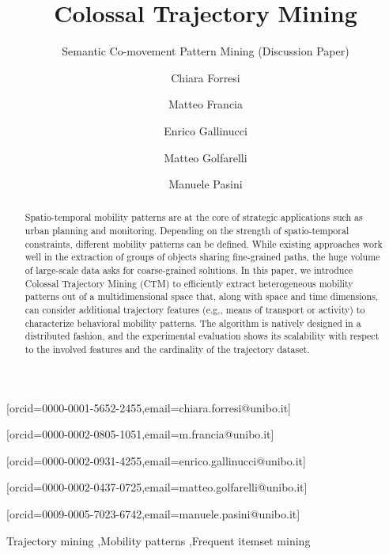 \documentclass[
]{ceurart}
\begin{document}
\sloppy
{}
\title{Colossal Trajectory Mining}
\subtitle{Semantic Co-movement Pattern Mining (Discussion Paper)}
\author[1]{Chiara Forresi}[orcid=0000-0001-5652-2455,email=chiara.forresi@unibo.it]
\address[1]{DISI --- University of Bologna, Cesena, Italy}
\author[1]{Matteo Francia}[orcid=0000-0002-0805-1051,email=m.francia@unibo.it]
\cormark[1]%
\author[1]{Enrico Gallinucci}[orcid=0000-0002-0931-4255,email=enrico.gallinucci@unibo.it]
\author[1]{Matteo Golfarelli}[orcid=0000-0002-0437-0725,email=matteo.golfarelli@unibo.it]
\author[1]{Manuele Pasini}[orcid=0009-0005-7023-6742,email=manuele.pasini@unibo.it]

\begin{abstract}
Spatio-temporal mobility patterns are at the core of strategic applications such as urban planning and monitoring.
Depending on the strength of spatio-temporal constraints, different mobility patterns can be defined. 
While existing approaches work well in the extraction of groups of objects sharing fine-grained paths, the huge volume of large-scale data asks for coarse-grained solutions.
In this paper, we introduce Colossal Trajectory Mining (CTM) to efficiently extract heterogeneous mobility patterns out of a multidimensional space that, along with space and time dimensions, can consider additional trajectory features (e.g., means of transport or activity) to characterize behavioral mobility patterns. 
The algorithm is natively designed in a distributed fashion, and the experimental evaluation shows its scalability with respect to the involved features and the cardinality of the trajectory dataset.
\end{abstract}

\begin{keywords}
Trajectory mining \sep Mobility patterns \sep Frequent itemset mining
\end{keywords}

\maketitle
\end{document}
